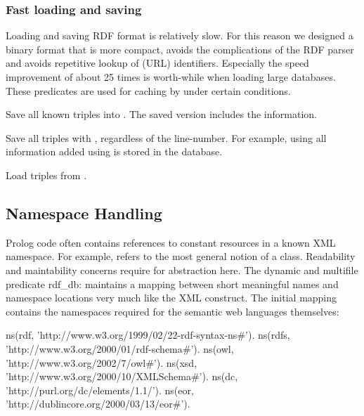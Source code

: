 \documentclass[11pt]{article}
\begin{document}
\subsubsection{Fast loading and saving}		\label{sec:rdffastfile}

Loading and saving RDF format is relatively slow.  For this reason we
designed a binary format that is more compact, avoids the complications
of the RDF parser and avoids repetitive lookup of (URL) identifiers.
Especially the speed improvement of about 25 times is worth-while when
loading large databases.  These predicates are used for caching by
 under certain conditions.

\begin{description}
Save all known triples into .  The saved version includes the
 information.

Save all triples with  , regardless of the
line-number. For example, using  all information added
using  is stored in the database.

Load triples from .  
\end{description}


\subsection{Namespace Handling}			\label{sec:rdfns}

Prolog code often contains references to constant resources in a known
XML namespace. For example,
 refers to the most
general notion of a class. Readability and maintability concerns require
for abstraction here.  The dynamic and multifile predicate rdf_db:
maintains a mapping between short meaningful names and namespace
locations very much like the XML  construct.  The initial
mapping contains the namespaces required for the semantic web languages
themselves:

\begin{code}
ns(rdf,  'http://www.w3.org/1999/02/22-rdf-syntax-ns#').
ns(rdfs, 'http://www.w3.org/2000/01/rdf-schema#').
ns(owl,  'http://www.w3.org/2002/7/owl#').
ns(xsd,  'http://www.w3.org/2000/10/XMLSchema#').
ns(dc,   'http://purl.org/dc/elements/1.1/').
ns(eor,  'http://dublincore.org/2000/03/13/eor#').
\end{code}
\end{document}
